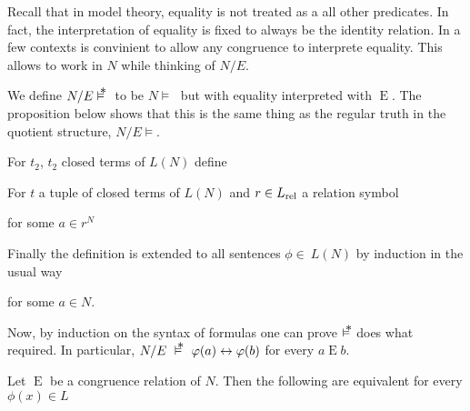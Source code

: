 Recall that in model theory, equality is not treated as a all other predicates.
In fact, the interpretation of equality is fixed to always be the identity relation.
In a few contexts is convinient to allow any congruence to interprete equality.
This allows to work in $N$ while thinking of $N/E$.

We define $N/E\pmodels\;$ to be $N\models\;$ but with equality interpreted with $\mathrel{E}$.
The proposition below shows that this is the same thing as the regular truth in the quotient structure,  $N/E\models$.

\begin{definition}\label{def_pseudostructure}
For $t_2$, $t_2$ closed terms of $L(N)$ define


For $t$ a tuple of closed terms of $L(N)$ and $r\in L_{\rm rel}$ a relation symbol

\quad for some $a\in r^N$

Finally the definition is extended to all sentences $\phi\in\ L(N)$ by induction in the usual way



\quad for some $a\in N$.
\end{definition}

% 
% 
% 


Now, by induction on the syntax of formulas one can prove $\pmodels$ does what required.
In particular, $N/E\ \pmodels\ \phi(a)\iff\phi(b)$ for every $a\mathrel{E} b$.

\begin{proposition}\label{prop_pseudomodel}
Let $\mathrel{E}$ be a congruence relation of $N$.
Then the following are equivalent for every $\phi(x)\in L$


\end{proposition}


